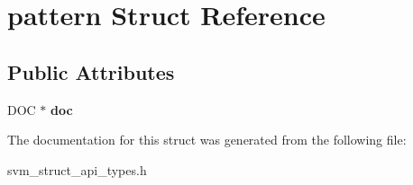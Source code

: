 \hypertarget{structpattern}{}\section{pattern Struct Reference}
\label{structpattern}
\subsection*{Public Attributes}
\begin{DoxyCompactItemize}
\item 
\hypertarget{structpattern_aa96a91342cad0e0116b21f96047fddac}{}D\+O\+C $\ast$ {\bfseries doc}\label{structpattern_aa96a91342cad0e0116b21f96047fddac}

\end{DoxyCompactItemize}


The documentation for this struct was generated from the following file\+:\begin{DoxyCompactItemize}
\item 
svm\+\_\+struct\+\_\+api\+\_\+types.\+h\end{DoxyCompactItemize}
